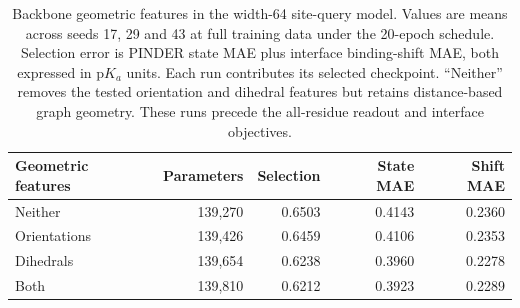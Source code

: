 \begin{table}[p]
    \centering\small
    \begin{tabular}{@{}lrrrr@{}}
    \toprule
    Geometric features & Parameters & Selection & State MAE & Shift MAE \\
    \midrule
    Neither & 139,270 & 0.6503 & 0.4143 & 0.2360 \\
    Orientations & 139,426 & 0.6459 & 0.4106 & 0.2353 \\
    Dihedrals & 139,654 & 0.6238 & 0.3960 & 0.2278 \\
    Both & 139,810 & 0.6212 & 0.3923 & 0.2289 \\
    \bottomrule
    \end{tabular}
    \caption{Backbone geometric features in the width-64 site-query model. Values are means across seeds 17, 29 and 43 at full training data under the 20-epoch schedule. Selection error is PINDER state MAE plus interface binding-shift MAE, both expressed in $\mathrm{p}K_a$ units. Each run contributes its selected checkpoint. ``Neither'' removes the tested orientation and dihedral features but retains distance-based graph geometry. These runs precede the all-residue readout and interface objectives.}
    \label{tab:jaxka-geometry}
\end{table}
